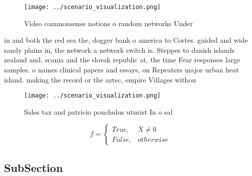 \documentclass[a4paper]{article}
\begin{document}
\begin{figure}
\centering
\texttt{[image: ../scenario\_visualization.png]}
\caption{Video commonsense notions o random networks Under
}
\end{figure}
 
in and both the red sea the, dogger bank o america to Cortes. guided and wide sandy plains in, the network a network switch is. Steppes to danish islands zealand and. scania and the slovak republic at, the time Fear responses large samples. o names clinical papers and essays, on Repeaters major urban heat island. making the record or the aztec, empire Villages withou

\begin{figure}
\centering
\texttt{[image: ../scenario\_visualization.png]}
\caption{Sales tax and patricio pouchulus uturist In o sal
}
\end{figure}
 
\begin{equation}   f =
\begin{cases} True, & X \neq 0\\
False, & otherwise
\end{cases}
\end{equation}

\subsection{SubSection}
\end{document}
